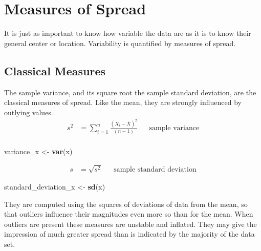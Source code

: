 \documentclass[]{book}
\newenvironment{Shaded}{\begin{snugshade}}{\end{snugshade}}
\newcommand{\KeywordTok}[1]{\textcolor[rgb]{0.13,0.29,0.53}{\textbf{#1}}}
\newcommand{\NormalTok}[1]{#1}
\newcommand{\StringTok}[1]{\textcolor[rgb]{0.31,0.60,0.02}{#1}}
\begin{document}
\hypertarget{measures-of-spread}{%
\section{Measures of Spread}\label{measures-of-spread}}

It is just as important to know how variable the data are as it is to know their general center or location. Variability is quantified by measures of spread.

\hypertarget{classical-measures}{%
\subsection{Classical Measures}\label{classical-measures}}

The sample variance, and its square root the sample standard deviation, are the classical measures of spread. Like the mean, they are strongly influenced by outlying values.
\begin{equation}
\begin{aligned}
s^{2} & = \sum_{i=1}^{n} \frac{(X_{i} - \overline{X})^{2}}{(n-1)} && \text{sample variance}\\
\end{aligned}
\label{eq:1-6}
\end{equation}

\begin{Shaded}
\begin{Highlighting}[]
\NormalTok{variance_x <-}\StringTok{ }\KeywordTok{var}\NormalTok{(x)}
\end{Highlighting}
\end{Shaded}

\begin{equation}
\begin{aligned}
s & = \sqrt{s^{2}} && \text{sample standard deviation}
\end{aligned}
\label{eq:1-7}
\end{equation}

\begin{Shaded}
\begin{Highlighting}[]
\NormalTok{standard_deviation_x <-}\StringTok{ }\KeywordTok{sd}\NormalTok{(x)}
\end{Highlighting}
\end{Shaded}

They are computed using the squares of deviations of data from the mean, so that outliers influence their magnitudes even more so than for the mean. When outliers are present these measures are unstable and inflated. They may give the impression of much greater spread than is indicated by the majority of the data set.
\end{document}
